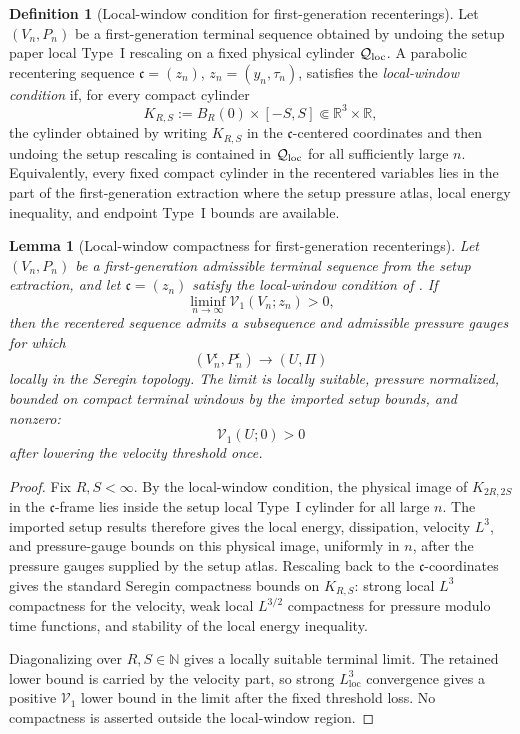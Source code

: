 \documentclass[11pt]{amsart}
\numberwithin{equation}{section}
\theoremstyle{plain}
\newtheorem{lemma}[lemma]{Lemma}
\theoremstyle{definition}
\newtheorem{definition}[definition]{Definition}
\theoremstyle{remark}
\newcommand{\loc}{\mathrm{loc}}
\newcommand{\Vel}{\mathcal V}
\begin{document}
\begin{definition}[Local-window condition for first-generation recenterings]
\label{def:first-generation-local-window-condition}
Let \((V_n,P_n)\) be a first-generation terminal sequence obtained by undoing
the setup paper local Type~I rescaling on a fixed physical cylinder
\(\mathcal Q_{\rm loc}\).  A parabolic recentering sequence
\(\mathfrak c=(z_n)\), \(z_n=(y_n,\tau_n)\), satisfies the
\emph{local-window condition} if, for every compact cylinder
\[
   K_{R,S}:=B_R(0)\times[-S,S]\Subset\mathbb R^3\times\mathbb R,
\]
the cylinder obtained by writing \(K_{R,S}\) in the \(\mathfrak c\)-centered
coordinates and then undoing the setup rescaling is contained in
\(\mathcal Q_{\rm loc}\) for all sufficiently large \(n\).  Equivalently, every
fixed compact cylinder in the recentered variables lies in the part of the
first-generation extraction where the setup pressure atlas, local energy
inequality, and endpoint Type~I bounds are available.
\end{definition}

\begin{lemma}[Local-window compactness for first-generation recenterings]
\label{lem:first-generation-local-window-compactness}
Let \((V_n,P_n)\) be a first-generation admissible terminal sequence from the
setup extraction, and let \(\mathfrak c=(z_n)\) satisfy the local-window
condition of .  If
\[
   \liminf_{n\to\infty}\Vel_1(V_n;z_n)>0,
\]
then the recentered sequence admits a subsequence and admissible pressure gauges
for which
\[
   (V_n^{\mathfrak c},P_n^{\mathfrak c})
   \longrightarrow (U,\Pi)
\]
locally in the Seregin topology.  The limit is locally suitable, pressure
normalized, bounded on compact terminal windows by the imported setup bounds,
and nonzero:
\[
   \Vel_1(U;0)>0
\]
after lowering the velocity threshold once.
\end{lemma}

\begin{proof}
Fix \(R,S<\infty\).  By the local-window condition, the physical image of
\(K_{2R,2S}\) in the \(\mathfrak c\)-frame lies inside the setup local Type~I
cylinder for all large \(n\).  The imported setup results therefore gives the
local energy, dissipation, velocity \(L^3\), and pressure-gauge bounds on this
physical image, uniformly in \(n\), after the pressure gauges supplied by the
setup atlas.  Rescaling back to the \(\mathfrak c\)-coordinates gives the
standard Seregin compactness bounds on \(K_{R,S}\): strong local \(L^3\)
compactness for the velocity, weak local \(L^{3/2}\) compactness for pressure
modulo time functions, and stability of the local energy inequality.

Diagonalizing over \(R,S\in\mathbb N\) gives a locally suitable terminal limit.
The retained lower bound is carried by the velocity part, so strong
\(L^3_{\loc}\) convergence gives a positive \(\Vel_1\) lower bound in the
limit after the fixed threshold loss.  No compactness is asserted outside the
local-window region.
\end{proof}
\end{document}
